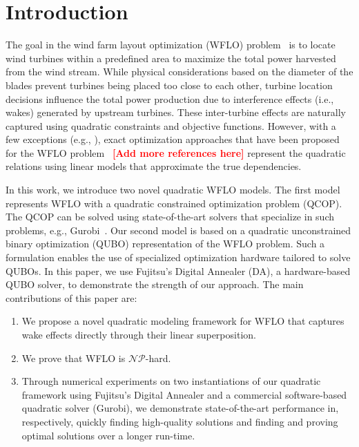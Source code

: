 \documentclass[preprint,12pt]{elsarticle}
\newcommand{\todo}[1]{{\textcolor{red}{\bf {#1}}}}
\begin{document}
\maketitle 

\section{Introduction}
The goal in the wind farm layout optimization (WFLO)
problem~\cite{MOSETTI1994105} is to locate wind turbines within a
predefined area to maximize the total power harvested from the wind
stream.  While physical considerations based on the diameter of the
blades prevent turbines being placed too close to each other, turbine
location decisions influence the total power production due to
interference effects (i.e., wakes) generated by upstream turbines.
These inter-turbine effects are naturally captured using quadratic
constraints and objective functions. However, with a few exceptions (e.g., \cite{turner2014new}), exact optimization
approaches that have been proposed for the WFLO
problem~\cite{Zhang2014,kuo2016wind} \todo{[Add more references here]}
represent the quadratic relations using linear models
that approximate the true dependencies.

In this work, we introduce two novel quadratic WFLO models. The first
model represents WFLO with a quadratic constrained optimization
problem (QCOP).  The QCOP can be solved using state-of-the-art solvers
that specialize in such problems, e.g., Gurobi~\cite{gurobi}.  Our
second model is based on a quadratic unconstrained binary optimization
(QUBO) representation of the WFLO problem.  Such a formulation enables the use of
specialized optimization hardware tailored to solve QUBOs. In this
paper, we use Fujitsu's Digital Annealer (DA), a hardware-based
QUBO solver, to demonstrate the strength of our approach. The main
contributions of this paper are:
\begin{enumerate} 
\item We propose a novel quadratic modeling framework for WFLO that captures wake 
effects directly through their linear superposition. 
\item We prove that WFLO is $\mathcal{NP}$-hard.
\item Through numerical experiments on two instantiations of our quadratic framework using Fujitsu's Digital Annealer and a commercial software-based quadratic solver (Gurobi), we demonstrate state-of-the-art performance in, respectively, quickly finding high-quality solutions and finding and proving optimal solutions over a longer run-time.
\end{enumerate}
\end{document}

